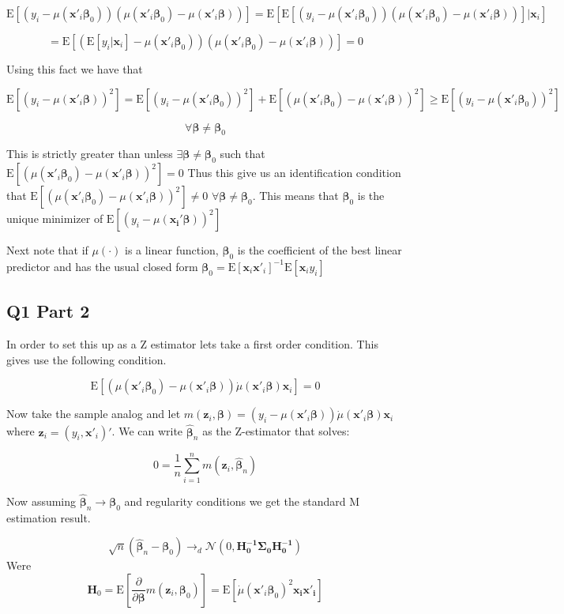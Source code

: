 \documentclass[11pt]{article}
\newcommand{\E}{\mathrm{E}}
\newcommand{\N}{\mathcal{N}}
\begin{document}
$$
\E[(y_i-\mu(\bm{x}'_i\bm{\beta}_0))(\mu(\bm{x}'_i\bm{\beta}_0) -\mu(\bm{x}'_i\bm{\beta}))] = \E[\E[(y_i-\mu(\bm{x}'_i\bm{\beta}_0))(\mu(\bm{x}'_i\bm{\beta}_0) -\mu(\bm{x}'_i\bm{\beta})) ]| \bm{x}_i]
$$

$$
= \E[(\E[y_i| \bm{x}_i]-\mu(\bm{x}'_i\bm{\beta}_0))(\mu(\bm{x}'_i\bm{\beta}_0) -\mu(\bm{x}'_i\bm{\beta}))] = 0
$$

Using this fact we have that 

$$
\E[(y_i - \mu(\bm{x}'_i\bm{\beta}))^2] =\E[(y_i-\mu(\bm{x}'_i\bm{\beta}_0))^2] + \E[(\mu(\bm{x}'_i\bm{\beta}_0) -\mu(\bm{x}'_i\bm{\beta}) )^2] \geq\E[(y_i-\mu(\bm{x}'_i\bm{\beta}_0))^2]
$$

$$ \forall \bm{\beta} \neq \bm{\beta}_0
$$

This is strictly greater than unless $\exists \bm{\beta} \neq \bm{\beta}_0 $ such that $\E[(\mu(\bm{x}'_i\bm{\beta}_0) -\mu(\bm{x}'_i\bm{\beta}) )^2] = 0 $ Thus this give us an identification condition that $\E[(\mu(\bm{x}'_i\bm{\beta}_0) -\mu(\bm{x}'_i\bm{\beta}) )^2] \neq 0$ $\forall \bm{\beta} \neq \bm{\beta}_0 $. This means that $\bm{\beta}_0$ is the unique minimizer of $\E[ (y_i - \mu(\bm{x_i' \beta}))^2]$

Next note that if $\mu(\cdot)$ is a linear function, $\bm{\beta}_0$ is the coefficient of the best linear predictor and has the usual closed form $\bm{\beta}_0 = \E[\bm{x}_i \bm{x}'_i]^{-1} \E[\bm{x}_i y_i]
$

\subsection{Q1 Part 2}

In order to set this up as a Z estimator lets take a first order condition. This gives use the following condition. 

$$ \E[(\mu(\bm{x}'_i\bm{\beta}_0) - \mu(\bm{x}'_i \bm{\beta})) \dot{\mu}(\bm{x}'_i\bm{\beta})\bm{x}_i] = 0 
$$

Now take the sample analog and let $m(\bm{z}_i, \bm{\beta}) = (y_i - \mu(\bm{x}'_i \bm{\beta})) \dot{\mu}(\bm{x}'_i\bm{\beta})\bm{x}_i $ where $\bm{z}_i = (y_i, \bm{x}'_i)'$. We can write $\hat{\bm{\beta}}_n$ as the Z-estimator that solves:

$$ 0 = \frac{1}{n} \sum_{i=1}^{n} m(\bm{z}_i, \hat{\bm{\beta}}_n)
$$

Now assuming $ \hat{\bm{\beta}}_n \to \bm{\beta}_0 $ and regularity conditions we get the standard M estimation result.

$$ \sqrt{n}(\hat{\bm{\beta}}_n - \bm{\beta}_0) \to_d \N(0, \bm{H_0^{-1} \Sigma_0 H_0^{-1}})
$$ 
Were 
$$
\bm{H}_0 = \E \left[ \frac{\partial}{\partial \bm{\beta}} m(\bm{z}_i, \bm{\beta}_0) \right] = \E[ \dot{\mu}(\bm{x}'_i \bm{\beta}_0)^2\bm{x_ix'_i} ]
$$
\end{document}
